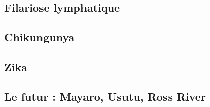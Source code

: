 \subsection{Filariose lymphatique}

\subsection{Chikungunya}

%


\subsection{Zika}

\subsection{Le futur : Mayaro, Usutu, Ross River}

